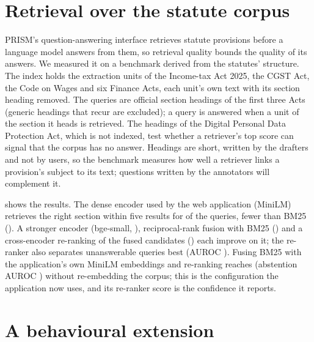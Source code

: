 \documentclass[sn-apa]{sn-jnl}
\begin{document}
\begin{appendices}

\section{Retrieval over the statute corpus}\label{app:rag}

PRISM's question-answering interface retrieves statute provisions before a
language model answers from them, so retrieval quality bounds the quality of
its answers. We measured it on a benchmark derived from the statutes'
structure. The index holds the  extraction units of the
Income-tax Act 2025, the CGST Act, the Code on Wages and six Finance Acts,
each unit's own text with its section heading removed. The queries are
 official section headings of the first three Acts (generic
headings that recur are excluded); a query is answered when a unit of the
section it heads is retrieved. The  headings of the
Digital Personal Data Protection Act, which is not indexed, test whether a
retriever's top score can signal that the corpus has no answer. Headings
are short, written by the drafters and not by users, so the benchmark
measures how well a retriever links a provision's subject to its text;
questions written by the annotators will complement it.

 shows the results. The dense encoder used by the web
application (MiniLM) retrieves the right section within five results for
 of the queries, fewer than BM25
(). A stronger encoder (bge-small, ),
reciprocal-rank fusion with BM25 () and a cross-encoder
re-ranking of the fused candidates () each
improve on it; the re-ranker also separates unanswerable queries best
(AUROC ). Fusing BM25 with the application's
own MiniLM embeddings and re-ranking reaches 
(abstention AUROC ) without re-embedding the
corpus; this is the configuration the application now uses, and its
re-ranker score is the confidence it reports.



\section{A behavioural extension}\label{app:behaviour}


\end{appendices}
\end{document}
